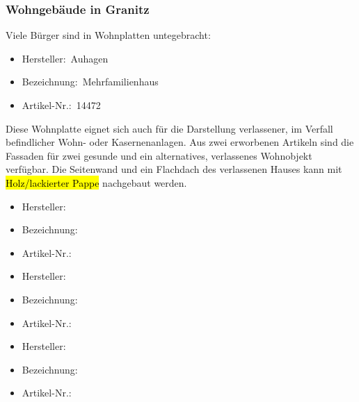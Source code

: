 \subsubsection{Wohngeb\"aude in Granitz}

Viele B\"urger sind in Wohnplatten untegebracht:
\begin{itemize}
	\item[] Hersteller:~Auhagen
	\item[] Bezeichnung:~Mehrfamilienhaus
	\item[] Artikel-Nr.:~14472
\end{itemize}
Diese Wohnplatte eignet sich auch f\"ur die Darstellung verlassener, im Verfall befindlicher Wohn- oder Kasernenanlagen.
Aus zwei erworbenen Artikeln sind die Fassaden f\"ur zwei gesunde und ein alternatives, verlassenes Wohnobjekt verf\"ugbar.
Die Seitenwand und ein Flachdach des verlassenen Hauses kann mit \hl{Holz/lackierter Pappe} nachgebaut werden.

\begin{itemize}
	\item[] Hersteller:~
	\item[] Bezeichnung:~
	\item[] Artikel-Nr.:~
\end{itemize}

\begin{itemize}
	\item[] Hersteller:~
	\item[] Bezeichnung:~
	\item[] Artikel-Nr.:~
\end{itemize}

\begin{itemize}
	\item[] Hersteller:~
	\item[] Bezeichnung:~
	\item[] Artikel-Nr.:~
\end{itemize}